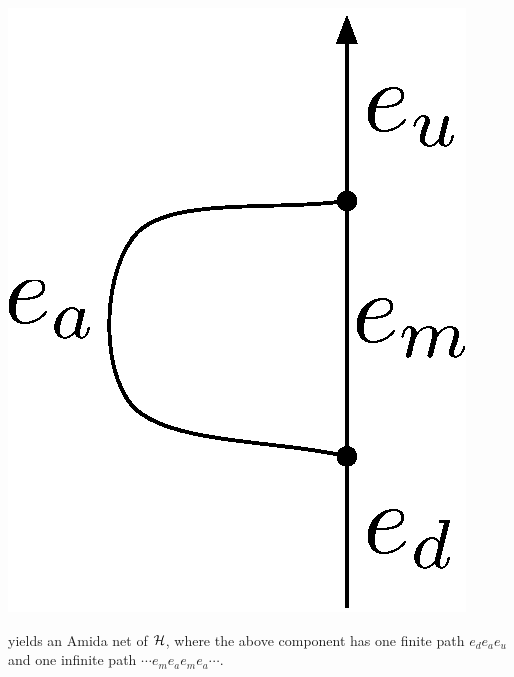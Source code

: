 \begin{definition}
\begin{itemize}
\begin{center}
	 \includegraphics[scale=0.4]{oneedge_amida.eps}
	\end{center}
       yields an Amida net of $\mathcal{H}$,
       where the above component has
       one finite path $e_de_ae_u$
       and one infinite path $\cdots e_m e_a e_m e_a \cdots$.
\end{itemize}
 \end{definition}

